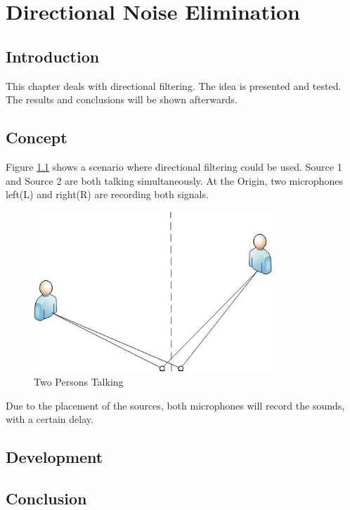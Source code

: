 \chapter{Directional Noise Elimination}\label{ch:directional}
\section{Introduction}
This chapter deals with directional filtering. The idea is presented and tested. The 
results and conclusions will be shown afterwards.
\section{Concept}
Figure \ref{fig:2sources} shows a scenario where directional filtering could be used.
Source 1 and Source 2 are both talking simultaneously. At the Origin, two microphones 
left(L) and right(R) are recording both signals.

\begin{figure}[htp]
	\centering
	\includegraphics[width=0.8\textwidth]{Illustrations/2sources.jpg}
	\caption{Two Persons Talking}
	\label{fig:2sources}
\end{figure}

Due to the placement of the sources, both microphones will record the sounds, with a 
certain delay.
\section{Development}
\section{Conclusion}